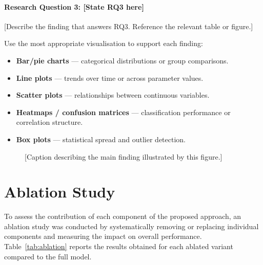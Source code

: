 \paragraph{Research Question 3: [State RQ3 here]}
[Describe the finding that answers RQ3. Reference the relevant table or figure.]

\noindent Use the most appropriate visualisation to support each finding:
\begin{itemize}
    \item \textbf{Bar/pie charts} --- categorical distributions or group comparisons.
    \item \textbf{Line plots} --- trends over time or across parameter values.
    \item \textbf{Scatter plots} --- relationships between continuous variables.
    \item \textbf{Heatmaps / confusion matrices} --- classification performance
    or correlation structure.
    \item \textbf{Box plots} --- statistical spread and outlier detection.
\end{itemize}

\begin{figure}[ht]
    \centering
    \caption{[Caption describing the main finding illustrated by this figure.]}
    \label{fig:findings}
\end{figure}

\section{Ablation Study}
\label{sec:ablation}

To assess the contribution of each component of the proposed approach, an ablation
study was conducted by systematically removing or replacing individual components
and measuring the impact on overall performance.
Table~\ref{tab:ablation} reports the results obtained for each ablated variant
compared to the full model.

